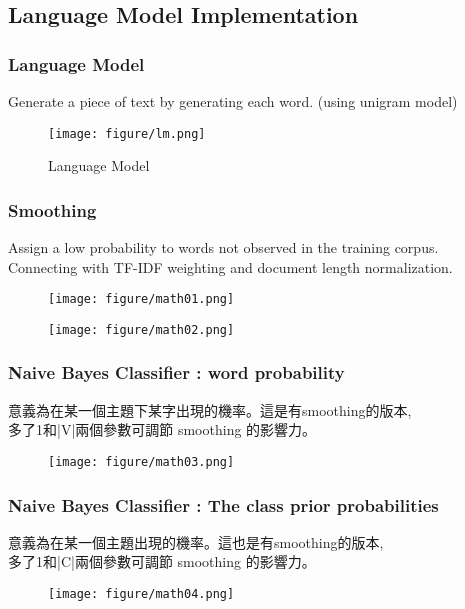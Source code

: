 \documentclass{beamer}
\begin{document}
\subsection{Language Model Implementation}
\begin{frame}
    \frametitle{Language Model}
        Generate a piece of text by generating each word. (using unigram model)
        \begin{figure}[H]
    	\begin{center}
        	\texttt{[image: figure/lm.png]}
			\caption{Language Model}
    	\end{center}
	\end{figure}
\end{frame}
\begin{frame}
    \frametitle{Smoothing}
    Assign a low probability to words not observed in the training corpus.\\
Connecting with TF-IDF weighting and document length normalization.
 \begin{figure}[H]
    	\begin{center}
        	\texttt{[image: figure/math01.png]}
    	\end{center}
	\end{figure}
	 \begin{figure}[H]
    	\begin{center}
        	\texttt{[image: figure/math02.png]}
    	\end{center}
	\end{figure}
\end{frame}

\begin{frame}
    \frametitle{Naive Bayes Classifier : word probability}
    意義為在某一個主題下某字出現的機率。這是有smoothing的版本,\\多了1和|V|兩個參數可調節 smoothing 的影響力。
    \begin{figure}[H]
    	\begin{center}
        	\texttt{[image: figure/math03.png]}
    	\end{center}
	\end{figure}

\end{frame}

\begin{frame}
    \frametitle{Naive Bayes Classifier : The class prior probabilities}
    意義為在某一個主題出現的機率。這也是有smoothing的版本,\\多了1和|C|兩個參數可調節 smoothing 的影響力。
    \begin{figure}[H]
    	\begin{center}
        	\texttt{[image: figure/math04.png]}
    	\end{center}
	\end{figure}

\end{frame}
\end{document}
